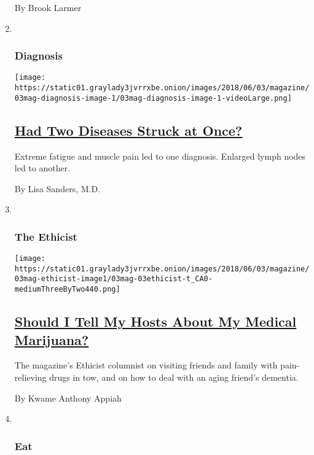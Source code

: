 \begin{enumerate}
  By Brook Larmer
\item ~
  \hypertarget{diagnosis}{%
  \subsubsection{Diagnosis}\label{diagnosis}}

  \texttt{[image: https://static01.graylady3jvrrxbe.onion/images/2018/06/03/magazine/03mag-diagnosis-image-1/03mag-diagnosis-image-1-videoLarge.png]}

  \hypertarget{had-two-diseases-struck-at-once}{%
  \subsection{\texorpdfstring{\href{/2018/05/30/magazine/had-two-diseases-struck-at-once.html}{Had
  Two Diseases Struck at
  Once?}}{Had Two Diseases Struck at Once?}}\label{had-two-diseases-struck-at-once}}

  Extreme fatigue and muscle pain led to one diagnosis. Enlarged lymph
  nodes led to another.

  By Lisa Sanders, M.D.
\item ~
  \hypertarget{the-ethicist}{%
  \subsubsection{The Ethicist}\label{the-ethicist}}

  \texttt{[image: https://static01.graylady3jvrrxbe.onion/images/2018/06/03/magazine/03mag-ethicist-image1/03mag-03ethicist-t\_CA0-mediumThreeByTwo440.png]}

  \hypertarget{should-i-tell-my-hosts-about-my-medical-marijuana}{%
  \subsection{\texorpdfstring{\href{/2018/05/29/magazine/should-i-tell-my-hosts-about-my-medical-marijuana.html}{Should
  I Tell My Hosts About My Medical
  Marijuana?}}{Should I Tell My Hosts About My Medical Marijuana?}}\label{should-i-tell-my-hosts-about-my-medical-marijuana}}

  The magazine's Ethicist columnist on visiting friends and family with
  pain-relieving drugs in tow, and on how to deal with an aging friend's
  dementia.

  By Kwame Anthony Appiah
\item ~
  \hypertarget{eat}{%
  \subsubsection{Eat}\label{eat}}


\end{enumerate}
